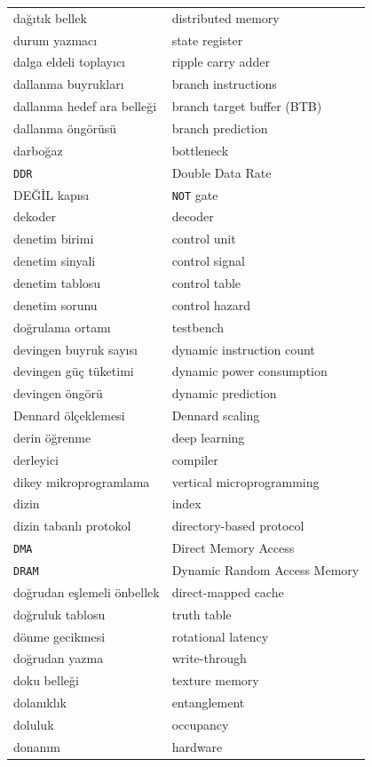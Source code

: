 {\begin{longtable}{@{}p{7.6cm}p{7.6cm}@{}}
dağıtık bellek & distributed memory \\
durum yazmacı & state register \\
dalga eldeli toplayıcı & ripple carry adder \\
dallanma buyrukları & branch instructions \\
dallanma hedef ara belleği & branch target buffer (BTB) \\
dallanma öngörüsü & branch prediction \\
darboğaz & bottleneck \\
\texttt{DDR} & Double Data Rate \\
DEĞİL kapısı & \texttt{NOT} gate \\
dekoder & decoder \\
denetim birimi & control unit \\
denetim sinyali & control signal \\
denetim tablosu & control table \\
denetim sorunu & control hazard \\
doğrulama ortamı & testbench \\
devingen buyruk sayısı & dynamic instruction count \\
devingen güç tüketimi & dynamic power consumption \\
devingen öngörü & dynamic prediction \\
Dennard ölçeklemesi & Dennard scaling \\
derin öğrenme & deep learning \\
derleyici & compiler \\
dikey mikroprogramlama & vertical microprogramming \\
dizin & index \\
dizin tabanlı protokol & directory-based protocol \\
\texttt{DMA} & Direct Memory Access \\
\texttt{DRAM} & Dynamic Random Access Memory \\
doğrudan eşlemeli önbellek & direct-mapped cache \\
doğruluk tablosu & truth table \\
dönme gecikmesi & rotational latency \\
doğrudan yazma & write-through \\
doku belleği & texture memory \\
dolanıklık & entanglement \\
doluluk & occupancy \\
donanım & hardware \\

\end{longtable}}
